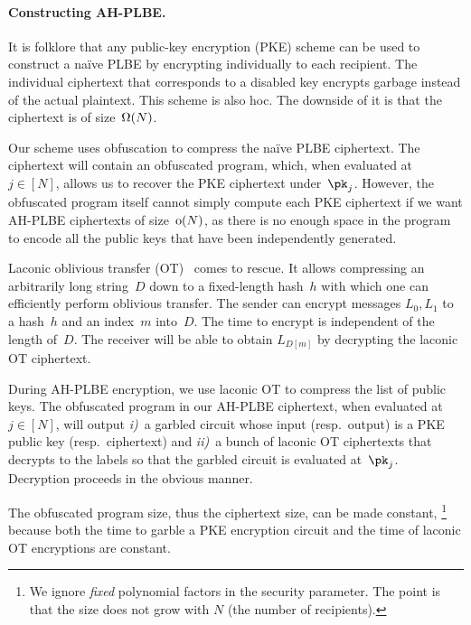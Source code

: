 \paragraph{Constructing AH-PLBE.}
It is folklore that any public-key encryption (PKE) scheme can be used to construct a na{\"i}ve PLBE by encrypting individually to each recipient.
The individual ciphertext that corresponds to a disabled key encrypts garbage instead of the actual plaintext.
This scheme is also \ad hoc.
The downside of it is that the ciphertext is of size~$\operatorname{\Omega}(N)$.

Our scheme uses obfuscation to compress the na{\"i}ve PLBE ciphertext.
The ciphertext will contain an obfuscated program, which, when evaluated at~${j\in[N]}$, allows us to recover the PKE ciphertext under~$\pk_j$.
However, the obfuscated program itself cannot simply compute each PKE ciphertext if we want AH-PLBE ciphertexts of size~$\operatorname{o}(N)$, as there is no enough space in the program to encode all the public keys that have been independently generated.

Laconic oblivious transfer (OT)~\cite{C:CDGGMP17} comes to rescue.
It allows compressing an arbitrarily long string~$D$ down to a fixed-length hash~$h$ with which one can efficiently perform oblivious transfer.
The sender can encrypt messages $L_0,L_1$ to a hash~$h$ and an index~$m$ into~$D$.
The time to encrypt is independent of the length of~$D$.
The receiver will be able to obtain $L_{D[m]}$ by decrypting the laconic OT ciphertext.

During AH-PLBE encryption, we use laconic OT to compress the list of public keys.
The obfuscated program in our AH-PLBE ciphertext, when evaluated at~${j\in[N]}$, will output
\emph{i)}~a garbled circuit whose input (resp.~output) is a PKE public key (resp.~ciphertext) and
\emph{ii)}~a bunch of laconic OT ciphertexts that decrypts to the labels so that the garbled circuit is evaluated at~$\pk_j$.
Decryption proceeds in the obvious manner.

The obfuscated program size, thus the ciphertext size, can be made constant,%
\footnote{We ignore \emph{fixed} polynomial factors in the security parameter.
The point is that the size does not grow with $N$ (the number of recipients).}
because
both the time to garble a PKE encryption circuit and the time of laconic OT encryptions are constant.
